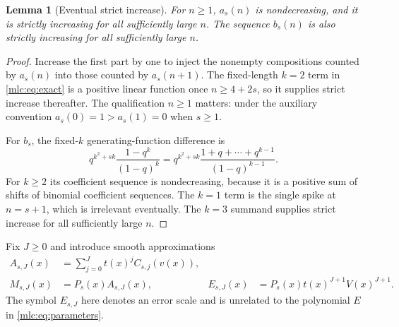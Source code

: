 \documentclass[11pt]{article}
\newtheorem{lemma}[theorem]{Lemma}
\theoremstyle{remark}\newtheorem{remark}[theorem]{Remark}
\begin{document}
\begin{lemma}[Eventual strict increase]\label{mlc:lem:monotonic}
For $n\ge1$, $a_s(n)$ is nondecreasing, and it is strictly increasing for all sufficiently large $n$. The sequence $b_s(n)$ is also strictly increasing for all sufficiently large $n$.
\end{lemma}
\begin{proof}
Increase the first part by one to inject the nonempty compositions counted by $a_s(n)$ into those counted by $a_s(n+1)$. The fixed-length $k=2$ term in \eqref{mlc:eq:exact} is a positive linear function once $n\ge4+2s$, so it supplies strict increase thereafter. The qualification $n\ge1$ matters: under the auxiliary convention $a_s(0)=1>a_s(1)=0$ when $s\ge1$.

For $b_s$, the fixed-$k$ generating-function difference is
\begin{equation}\label{mlc:eq:bgf}
 q^{k^2+sk}\frac{1-q^k}{(1-q)^k}
  =q^{k^2+sk}\frac{1+q+\cdots+q^{k-1}}{(1-q)^{k-1}}.
\end{equation}
For $k\ge2$ its coefficient sequence is nondecreasing, because it is a positive sum of shifts of binomial coefficient sequences. The $k=1$ term is the single spike at $n=s+1$, which is irrelevant eventually. The $k=3$ summand supplies strict increase for all sufficiently large $n$.
\end{proof}

Fix $J\ge0$ and introduce smooth approximations
\begin{align}
 A_{s,J}(x)&=\sum_{j=0}^{J}t(x)^j C_{s,j}(v(x)),\label{mlc:eq:Atrunc}\\
 M_{s,J}(x)&=P_s(x)A_{s,J}(x),&
 E_{s,J}(x)&=P_s(x)t(x)^{J+1}V(x)^{J+1}.\label{mlc:eq:Mtrunc}
\end{align}
The symbol $E_{s,J}$ here denotes an error scale and is unrelated to the polynomial $E$ in \eqref{mlc:eq:parameters}.
\end{document}
